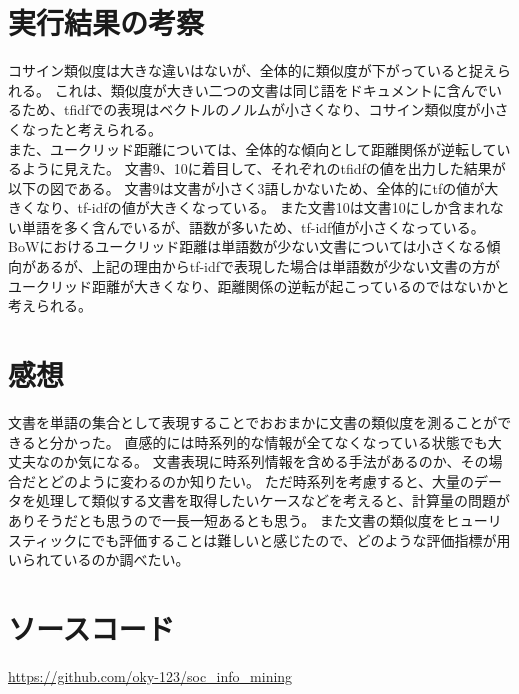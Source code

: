 \documentclass{jsarticle}
\begin{document}
\section{実行結果の考察}

コサイン類似度は大きな違いはないが、全体的に類似度が下がっていると捉えられる。
これは、類似度が大きい二つの文書は同じ語をドキュメントに含んでいるため、tfidfでの表現はベクトルのノルムが小さくなり、コサイン類似度が小さくなったと考えられる。\\
また、ユークリッド距離については、全体的な傾向として距離関係が逆転しているように見えた。
文書9、10に着目して、それぞれのtfidfの値を出力した結果が以下の図である。
文書9は文書が小さく3語しかないため、全体的にtfの値が大きくなり、tf-idfの値が大きくなっている。
また文書10は文書10にしか含まれない単語を多く含んでいるが、語数が多いため、tf-idf値が小さくなっている。
BoWにおけるユークリッド距離は単語数が少ない文書については小さくなる傾向があるが、上記の理由からtf-idfで表現した場合は単語数が少ない文書の方がユークリッド距離が大きくなり、距離関係の逆転が起こっているのではないかと考えられる。

\section{感想}
文書を単語の集合として表現することでおおまかに文書の類似度を測ることができると分かった。
直感的には時系列的な情報が全てなくなっている状態でも大丈夫なのか気になる。
文書表現に時系列情報を含める手法があるのか、その場合だとどのように変わるのか知りたい。
ただ時系列を考慮すると、大量のデータを処理して類似する文書を取得したいケースなどを考えると、計算量の問題がありそうだとも思うので一長一短あるとも思う。
また文書の類似度をヒューリスティックにでも評価することは難しいと感じたので、どのような評価指標が用いられているのか調べたい。

\section{ソースコード}
\url{https://github.com/oky-123/soc_info_mining}
\end{document}
